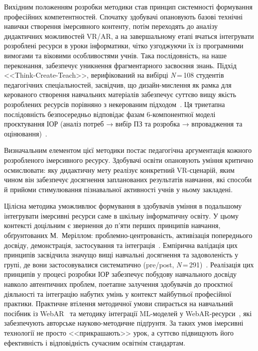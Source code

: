 Вихідним положенням розробки методики став принцип системності формування професійних компетентностей. Спочатку здобувачі опановують базові технічні навички створення імерсивного контенту, потім переходять до аналізу дидактичних можливостей VR/AR, а на завершальному етапі вчаться інтегрувати розроблені ресурси в уроки інформатики, чітко узгоджуючи їх із програмними вимогами та віковими особливостями учнів. Така послідовність, на наше переконання, забезпечує уникнення фрагментарного засвоєння знань. Підхід <<Think-Create-Teach>>, верифікований на вибірці \textit{N}\,=\,108 студентів педагогічних спеціальностей, засвідчив, що дизайн-мислення як рамка для керованого створення навчальних матеріалів забезпечує суттєво вищу якість розроблених ресурсів порівняно з некерованим підходом~\cite{Calavia2023TCT}. Ця триетапна послідовність безпосередньо відповідає фазам 6-компонентної моделі проєктування ІОР (аналіз потреб → вибір ПЗ та розробка → впровадження та оцінювання)~\cite{Semerikov2022IERDesign}.

Визначальним елементом цієї методики постає педагогічна аргументація кожного розробленого імерсивного ресурсу. Здобувачі освіти опановують уміння критично осмислювати: яку дидактичну мету реалізує конкретний VR-сценарій, яким чином він забезпечує досягнення запланованих результатів навчання, які способи й прийоми стимулювання пізнавальної активності учнів у ньому закладені.

Цілісна методика уможливлює формування в здобувачів уміння в подальшому інтегрувати імерсивні ресурси саме в шкільну інформатичну освіту. У цьому контексті доцільним є звернення до п'яти перших принципів навчання, обґрунтованих М.~Меріллом: проблемно-центрованість, активізація попереднього досвіду, демонстрація, застосування та інтеграція~\cite{KGeneral2020}. Емпірична валідація цих принципів засвідчила значущо вищі навчальні досягнення та задоволеність у групі, де вони застосовувалися систематично (pre/post, \textit{N}\,=\,291)~\cite{Badali2020MerrillMOOC}. Реалізація цих принципів у процесі розробки ІОР забезпечує побудову навчального досвіду навколо автентичних проблем, поетапне залучення здобувачів до проєктної діяльності та інтеграцію набутих умінь у контекст майбутньої професійної практики. Практичне втілення методичної умови спирається на навчальний посібник із WebAR~\cite{Shepiliev2020WebAR} та методику інтеграції ML-моделей у WebAR-ресурси~\cite{Semerikov2024WebARML_CoSinE}, які забезпечують авторське науково-методичне підґрунтя. За таких умов імерсивні технології не просто <<прикрашають>> урок, а суттєво підвищують його ефективність і відповідність сучасним освітнім стандартам.

